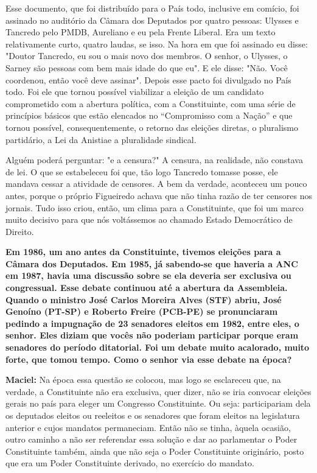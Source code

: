 Esse documento, que foi distribuído para o País todo, inclusive em
comício, foi assinado no auditório da Câmara dos Deputados por quatro
pessoas: Ulysses e Tancredo pelo PMDB, Aureliano e eu pela Frente
Liberal. Era um texto relativamente curto, quatro laudas, se isso. Na
hora em que foi assinado eu disse: "Doutor Tancredo, eu sou o mais novo
dos membros. O senhor, o Ulysses, o Sarney são pessoas com bem mais
idade do que eu". E ele disse: "Não. Você coordenou, então você deve
assinar". Depois esse pacto foi divulgado no País todo. Foi ele que
tornou possível viabilizar a eleição de um candidato comprometido com a
abertura política, com a Constituinte, com uma série de princípios
básicos que estão elencados no ``Compromisso com a Nação'' e que tornou
possível, consequentemente, o retorno das eleições diretas, o pluralismo
partidário, a Lei da Anistiae a pluralidade sindical.

Alguém poderá perguntar: "e a censura?" A censura, na realidade, não
constava de lei. O que se estabeleceu foi que, tão logo Tancredo tomasse
posse, ele mandava cessar a atividade de censores. A bem da verdade,
aconteceu um pouco antes, porque o próprio Figueiredo achava que não
tinha razão de ter censores nos jornais. Tudo isso criou, então, um
clima para a Constituinte, que foi um marco muito decisivo para que nós
voltássemos ao chamado Estado Democrático de Direito.

\textbf{Em 1986, um ano antes da Constituinte, tivemos eleições para a
Câmara dos Deputados. Em 1985, já sabendo-se que haveria a ANC em 1987,
havia uma discussão sobre se ela deveria ser exclusiva ou congressual.
Esse debate continuou até a abertura da Assembleia. Quando o ministro
José Carlos Moreira Alves (STF) abriu, José Genoíno (PT-SP) e Roberto
Freire (PCB-PE) se pronunciaram pedindo a impugnação de 23 senadores
eleitos em 1982, entre eles, o senhor. Eles diziam que vocês não
poderiam participar porque eram senadores do período ditatorial. Foi um
debate muito acalorado, muito forte, que tomou tempo. Como o senhor via
esse debate na época?}

\textbf{Maciel:} Na época essa questão se colocou, mas logo se
esclareceu que, na verdade, a Constituinte não era exclusiva, quer
dizer, não se iria convocar eleições gerais no país para eleger um
Congresso Constituinte. Ou seja: participariam dela os deputados eleitos
ou reeleitos e os senadores que foram eleitos na legislatura anterior e
cujos mandatos permaneciam. Então não se tinha, àquela ocasião, outro
caminho a não ser referendar essa solução e dar ao parlamentar o Poder
Constituinte também, ainda que não seja o Poder Constituinte originário,
posto que era um Poder Constituinte derivado, no exercício do mandato.

